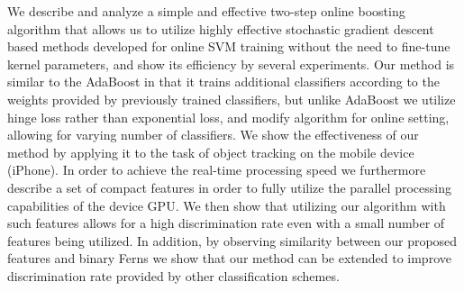 


\begin{abstracts}        %

We describe and analyze a simple and effective two-step online boosting algorithm that allows us to utilize highly effective stochastic gradient descent based methods developed for online SVM training without the need to fine-tune kernel parameters, and show its efficiency by several experiments. Our method is similar to the AdaBoost in that it trains additional classifiers according to the weights provided by previously trained classifiers, but unlike AdaBoost we utilize hinge loss rather than exponential loss, and modify algorithm for online setting, allowing for varying number of classifiers. 
We show the effectiveness of our method by applying it to the task of object tracking on the mobile device (iPhone). In order to achieve the real-time processing speed we furthermore describe a set of compact features in order to fully utilize the parallel processing capabilities of the device GPU. We then show that utilizing our algorithm with such features allows for a high discrimination rate even with a small number of features being utilized. In addition, by observing similarity between our proposed features and binary Ferns we show that our method can be extended to improve discrimination rate provided by other classification schemes.


\end{abstracts}


